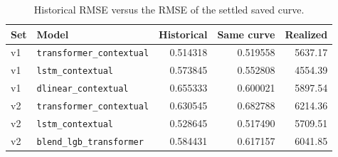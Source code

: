\begin{table}[!htbp]
\centering\small
\caption{Historical RMSE versus the RMSE of the settled saved curve.}\label{tab:provenance}
\begin{tabularx}{\linewidth}{@{}lXrrr@{}}
\toprule
Set & Model & Historical & Same curve & Realized \\
\midrule
v1 & \texttt{transformer\_contextual} & 0.514318 & 0.519558 & 5637.17 \\
v1 & \texttt{lstm\_contextual} & 0.573845 & 0.552808 & 4554.39 \\
v1 & \texttt{dlinear\_contextual} & 0.655333 & 0.600021 & 5897.54 \\
v2 & \texttt{transformer\_contextual} & 0.630545 & 0.682788 & 6214.36 \\
v2 & \texttt{lstm\_contextual} & 0.528645 & 0.517490 & 5709.51 \\
v2 & \texttt{blend\_lgb\_transformer} & 0.584431 & 0.617157 & 6041.85 \\
\bottomrule
\end{tabularx}
\par{}
\end{table}
